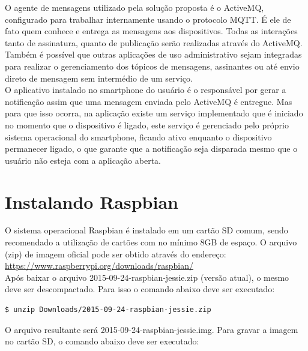 \indent O agente de mensagens utilizado pela solução proposta é o ActiveMQ, configurado para trabalhar internamente usando o protocolo MQTT. É ele de fato quem conhece e entrega as mensagens aos dispositivos. Todas as interações tanto de assinatura, quanto de publicação serão realizadas através do ActiveMQ. Também é possível que outras aplicações de uso administrativo sejam integradas para realizar o gerenciamento dos tópicos de mensagens, assinantes ou até envio direto de mensagem sem intermédio de um serviço. \\
\indent O aplicativo instalado no smartphone do usuário é o responsável por gerar a notificação assim que uma mensagem enviada pelo ActiveMQ é entregue. Mas para que isso ocorra, na aplicação existe um serviço implementado que é iniciado no momento que o dispositivo é ligado, este serviço é gerenciado pelo próprio sistema operacional do smartphone, ficando ativo enquanto o dispositivo permanecer ligado, o que garante que a notificação seja disparada mesmo que o usuário não esteja com a aplicação aberta.

\section{Instalando Raspbian}
\label{sec:instalando-raspbian}

O sistema operacional Raspbian é instalado em um cartão SD comum, sendo recomendado a utilização de cartões com no mínimo 8GB de espaço. O arquivo (zip) de imagem oficial pode ser obtido através do endereço: \\

\url{https://www.raspberrypi.org/downloads/raspbian/} \\

Após baixar o arquivo 2015-09-24-raspbian-jessie.zip (versão atual), o mesmo deve ser descompactado. Para isso o comando abaixo deve ser executado: \\

\begin{lstlisting}[language=bash]
$ unzip Downloads/2015-09-24-raspbian-jessie.zip
\end{lstlisting}


O arquivo resultante será 2015-09-24-raspbian-jessie.img. Para gravar a imagem no cartão SD, o comando abaixo deve ser executado: \\

